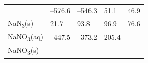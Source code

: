 \documentclass[
  9pt,
]{extbook}
\theoremstyle{definition}
\theoremstyle{definition}
\theoremstyle{definition}
\theoremstyle{remark}
\begin{document}
\begin{longtable}[]{@{}lllll@{}}
\begin{minipage}[t]{0.10\columnwidth}
\end{minipage} & \begin{minipage}[t]{0.19\columnwidth}\raggedright
--576.6\strut
\end{minipage} & \begin{minipage}[t]{0.20\columnwidth}\raggedright
--546.3\strut
\end{minipage} & \begin{minipage}[t]{0.18\columnwidth}\raggedright
51.1\strut
\end{minipage} & \begin{minipage}[t]{0.18\columnwidth}\raggedright
46.9\strut
\end{minipage}\tabularnewline
\begin{minipage}[t]{0.10\columnwidth}\raggedright
NaN\textsubscript{3}(s)\strut
\end{minipage} & \begin{minipage}[t]{0.19\columnwidth}\raggedright
21.7\strut
\end{minipage} & \begin{minipage}[t]{0.20\columnwidth}\raggedright
93.8\strut
\end{minipage} & \begin{minipage}[t]{0.18\columnwidth}\raggedright
96.9\strut
\end{minipage} & \begin{minipage}[t]{0.18\columnwidth}\raggedright
76.6\strut
\end{minipage}\tabularnewline
\begin{minipage}[t]{0.10\columnwidth}\raggedright
NaNO\textsubscript{3}(aq)\strut
\end{minipage} & \begin{minipage}[t]{0.19\columnwidth}\raggedright
--447.5\strut
\end{minipage} & \begin{minipage}[t]{0.20\columnwidth}\raggedright
--373.2\strut
\end{minipage} & \begin{minipage}[t]{0.18\columnwidth}\raggedright
205.4\strut
\end{minipage} & \begin{minipage}[t]{0.18\columnwidth}\raggedright
\strut
\end{minipage}\tabularnewline
\begin{minipage}[t]{0.10\columnwidth}\raggedright
NaNO\textsubscript{3}(s)\strut
\end{minipage} & \begin{minipage}[t]{0.19\columnwidth}\raggedright

\end{minipage}
\end{longtable}
\end{document}
